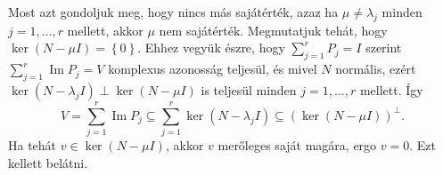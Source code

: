 \documentclass[a4paper, showtrims]{memoir}
\makeatletter
\renewenvironment{proof}[1][\proofname]
    {\par\pushQED{\qed}%
    \normalfont \topsep6\p@\@plus6\p@\relax
    \trivlist
    \item[\hskip\labelsep
        \itshape
    #1\@addpunct{:}]\ignorespaces}
    {\popQED\endtrivlist\@endpefalse}
\theoremstyle{plain}
\theoremstyle{remark}
\theoremstyle{definition}
\DeclareMathOperator{\im}{Im}
\makeatother
\begin{document}
\begin{proof}
	Most azt gondoljuk meg, hogy nincs más sajátérték, azaz ha $\mu\neq \lambda_j$ minden $j=1,\dots,r$ mellett,
    akkor $\mu$ nem sajátérték.
    Megmutatjuk tehát, hogy $\ker\left( N-\mu I \right)=\left\{ 0 \right\}$.
    Ehhez vegyük észre, hogy $\sum_{j=1}^rP_j=I$ szerint $\sum_{j=1}^r\im P_j=V$ komplexus azonosság teljesül,
    és mivel $N$ normális, ezért $\ker\left( N-\lambda_jI \right)\perp\ker\left( N-\mu I \right)$ is teljesül
    minden $j=1,\dots,r$ mellett.
    Így
    \[
        V=\sum_{j=1}^r\im P_j\subseteq\sum_{j=1}^r\ker\left( N-\lambda_jI \right)\subseteq\left( \ker\left( N-\mu I \right) \right)^\perp.
    \]
    Ha tehát $v\in\ker\left( N-\mu I \right)$, akkor $v$ merőleges saját magára, ergo $v=0$.
    Ezt kellett belátni. 
\end{proof}
\end{document}
